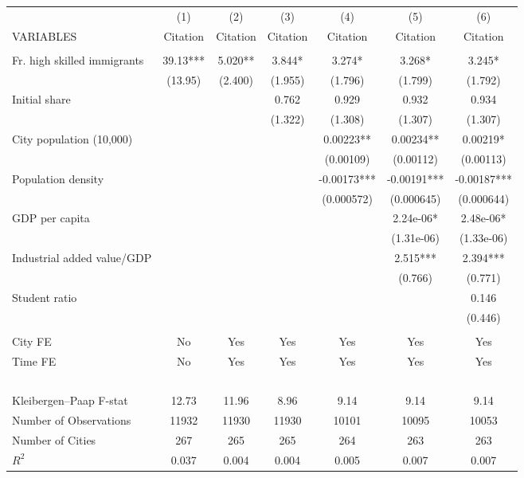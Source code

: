 \begin{tabular}{lcccccc} \hline
 & (1) & (2) & (3) & (4) & (5) & (6) \\
VARIABLES & Citation & Citation & Citation & Citation & Citation & Citation \\ \hline
 &  &  &  &  &  &  \\
Fr. high skilled immigrants & 39.13*** & 5.020** & 3.844* & 3.274* & 3.268* & 3.245* \\
 & (13.95) & (2.400) & (1.955) & (1.796) & (1.799) & (1.792) \\
Initial share &  &  & 0.762 & 0.929 & 0.932 & 0.934 \\
 &  &  & (1.322) & (1.308) & (1.307) & (1.307) \\
City population (10,000) &  &  &  & 0.00223** & 0.00234** & 0.00219* \\
 &  &  &  & (0.00109) & (0.00112) & (0.00113) \\
Population density &  &  &  & -0.00173*** & -0.00191*** & -0.00187*** \\
 &  &  &  & (0.000572) & (0.000645) & (0.000644) \\
GDP per capita &  &  &  &  & 2.24e-06* & 2.48e-06* \\
 &  &  &  &  & (1.31e-06) & (1.33e-06) \\
Industrial added value/GDP &  &  &  &  & 2.515*** & 2.394*** \\
 &  &  &  &  & (0.766) & (0.771) \\
Student ratio &  &  &  &  &  & 0.146 \\
 &  &  &  &  &  & (0.446) \\
 &  &  &  &  &  &  \\
City FE & No & Yes & Yes & Yes & Yes & Yes \\
Time FE & No & Yes & Yes & Yes & Yes & Yes \\
~ & ~ & ~ & ~ & ~ & ~ & ~ \\
Kleibergen–Paap F-stat & 12.73 & 11.96 & 8.96 & 9.14 & 9.14 & 9.14 \\
Number of Observations & 11932 & 11930 & 11930 & 10101 & 10095 & 10053 \\
Number of Cities & 267 & 265 & 265 & 264 & 263 & 263 \\
 $ R^2$ & 0.037 & 0.004 & 0.004 & 0.005 & 0.007 & 0.007 \\ \hline
\end{tabular}
